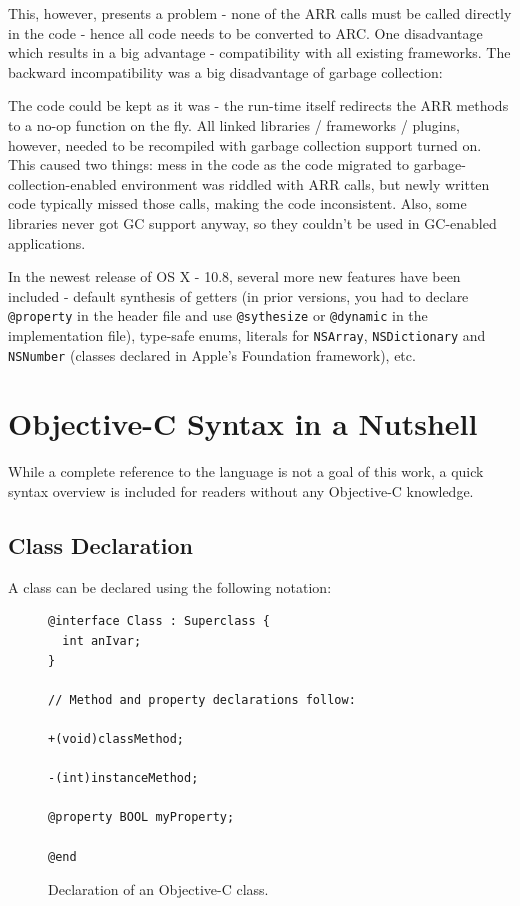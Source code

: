 This, however, presents a problem - none of the ARR calls must be called directly in the code - hence all code needs to be converted to ARC\@. One disadvantage which results in a big advantage - compatibility with all existing frameworks. The backward incompatibility was a big disadvantage of garbage collection: 

The code could be kept as it was - the run-time itself redirects the ARR methods to a no-op function on the fly. All linked libraries / frameworks / plugins, however, needed to be recompiled with garbage collection support turned on. This caused two things: mess in the code as the code migrated to garbage-collection-enabled environment was riddled with ARR calls, but newly written code typically missed those calls, making the code inconsistent. Also, some libraries never got GC support anyway, so they couldn't be used in GC-enabled applications.

In the newest release of OS X - 10.8, several more new features have been included - default synthesis of getters (in prior versions, you had to declare \verb=@property= in the header file and use \verb=@sythesize= or \verb=@dynamic= in the implementation file), type-safe enums, literals for \verb=NSArray=, \verb=NSDictionary= and \verb=NSNumber= (classes declared in Apple's Foundation framework), etc.

\section{Objective-C Syntax in a Nutshell}

While a complete reference to the language is not a goal of this work, a quick syntax overview is included for readers without any Objective-C knowledge.

\subsection{Class Declaration}

A class can be declared using the following notation:

\begin{figure}[H]
  \begin{verbatim}
@interface Class : Superclass {
  int anIvar;
}

// Method and property declarations follow:

+(void)classMethod;

-(int)instanceMethod;

@property BOOL myProperty;

@end
  \end{verbatim}
  \centering{}
  \caption{Declaration of an Objective-C class.}
  \label{fig:syntax_objc_class_decl}
\end{figure}


